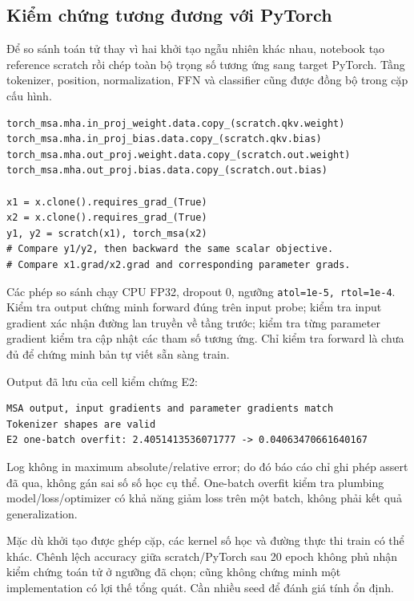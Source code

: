 \documentclass[11pt,a4paper]{article}
\begin{document}
\subsection{Kiểm chứng tương đương với PyTorch}\label{sec:verify}
Để so sánh toán tử thay vì hai khởi tạo ngẫu nhiên khác nhau, notebook tạo reference scratch rồi chép toàn bộ trọng số tương ứng sang target PyTorch. Tầng tokenizer, position, normalization, FFN và classifier cũng được đồng bộ trong cặp cấu hình.
\begin{lstlisting}
torch_msa.mha.in_proj_weight.data.copy_(scratch.qkv.weight)
torch_msa.mha.in_proj_bias.data.copy_(scratch.qkv.bias)
torch_msa.mha.out_proj.weight.data.copy_(scratch.out.weight)
torch_msa.mha.out_proj.bias.data.copy_(scratch.out.bias)

x1 = x.clone().requires_grad_(True)
x2 = x.clone().requires_grad_(True)
y1, y2 = scratch(x1), torch_msa(x2)
# Compare y1/y2, then backward the same scalar objective.
# Compare x1.grad/x2.grad and corresponding parameter grads.
\end{lstlisting}
Các phép so sánh chạy CPU FP32, dropout 0, ngưỡng \texttt{atol=1e-5, rtol=1e-4}. Kiểm tra output chứng minh forward đúng trên input probe; kiểm tra input gradient xác nhận đường lan truyền về tầng trước; kiểm tra từng parameter gradient kiểm tra cập nhật các tham số tương ứng. Chỉ kiểm tra forward là chưa đủ để chứng minh bản tự viết sẵn sàng train.

Output đã lưu của cell kiểm chứng E2:
\begin{lstlisting}[language={}]
MSA output, input gradients and parameter gradients match
Tokenizer shapes are valid
E2 one-batch overfit: 2.4051413536071777 -> 0.04063470661640167
\end{lstlisting}
Log không in maximum absolute/relative error; do đó báo cáo chỉ ghi phép assert đã qua, không gán sai số số học cụ thể. One-batch overfit kiểm tra plumbing model/loss/optimizer có khả năng giảm loss trên một batch, không phải kết quả generalization.

Mặc dù khởi tạo được ghép cặp, các kernel số học và đường thực thi train có thể khác. Chênh lệch accuracy giữa scratch/PyTorch sau 20 epoch không phủ nhận kiểm chứng toán tử ở ngưỡng đã chọn; cũng không chứng minh một implementation có lợi thế tổng quát. Cần nhiều seed để đánh giá tính ổn định.
\clearpage
\end{document}
